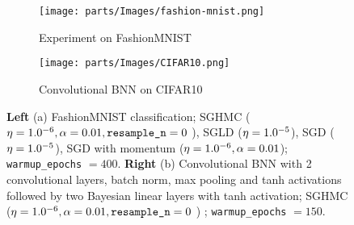 \begin{figure}
\centering
\begin{subfigure}{.5\textwidth}
  \centering
  \texttt{[image: parts/Images/fashion-mnist.png]}
  \caption{Experiment on FashionMNIST}
  \label{fig:fashionMNIST}
\end{subfigure}%
\begin{subfigure}{.5\textwidth}
  \centering
  \texttt{[image: parts/Images/CIFAR10.png]}
  \caption{Convolutional BNN on CIFAR10}
  \label{fig:CIFAR10}
\end{subfigure}
\caption{{\bf Left} (a) FashionMNIST classification; SGHMC ($\eta = 1.0\time10^{-6}, \alpha=0.01, \texttt{resample\_n} =0$ ), SGLD ($\eta = 1.0\time10^{-5}$), SGD ($\eta = 1.0\time10^{-5}$), SGD with momentum ($\eta = 1.0\time10^{-6}, \alpha=0.01$); \texttt{warmup\_epochs} $= 400$. {\bf Right} (b) Convolutional BNN with 2 convolutional layers, batch norm, max pooling and tanh activations followed by two Bayesian linear layers with tanh activation;  SGHMC ($\eta = 1.0\time10^{-6}, \alpha=0.01, \texttt{resample\_n} =0$ ) ; \texttt{warmup\_epochs} $= 150$.}
\label{fig:other-datasets}
\end{figure}